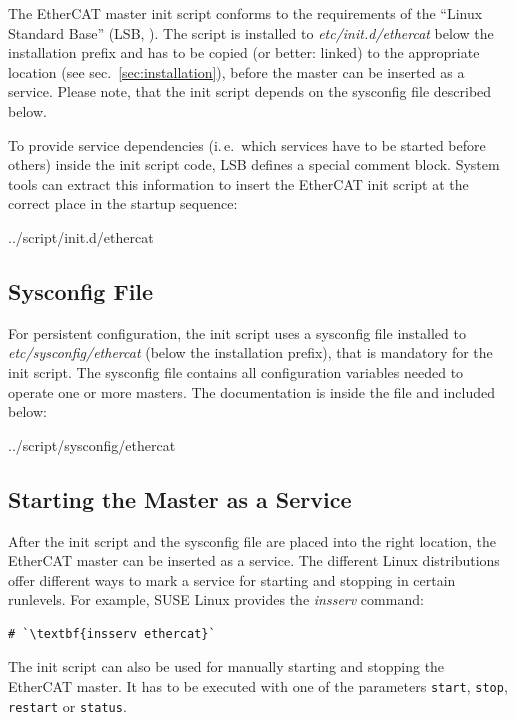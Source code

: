 \documentclass[a4paper,12pt,BCOR6mm,bibtotoc,idxtotoc]{scrbook}
\begin{document}
The EtherCAT master init script conforms to the requirements of the ``Linux
Standard Base'' (LSB, \cite{lsb}). The script is installed to
\textit{etc/init.d/ethercat} below the installation prefix and has to be
copied (or better: linked) to the appropriate location (see
sec.~\ref{sec:installation}), before the master can be inserted as a service.
Please note, that the init script depends on the sysconfig file described
below.

To provide service dependencies (i.\,e.\ which services have to be started
before others) inside the init script code, LSB defines a special comment
block. System tools can extract this information to insert the EtherCAT init
script at the correct place in the startup sequence:


    {../script/init.d/ethercat}

\subsection{Sysconfig File}
\label{sec:sysconfig}

For persistent configuration, the init script uses a sysconfig file installed
to \textit{etc/sysconfig/ethercat} (below the installation prefix), that is
mandatory for the init script. The sysconfig file contains all configuration
variables needed to operate one or more masters. The documentation is inside
the file and included below:


    {../script/sysconfig/ethercat}

\subsection{Starting the Master as a Service}
\label{sec:service}

After the init script and the sysconfig file are placed into the right
location, the EtherCAT master can be inserted as a service. The different Linux
distributions offer different ways to mark a service for starting and stopping
in certain runlevels. For example, SUSE Linux provides the \textit{insserv}
command:

\begin{lstlisting}
# `\textbf{insserv ethercat}`
\end{lstlisting}

The init script can also be used for manually starting and stopping
the EtherCAT master. It has to be executed with one of the parameters
\texttt{start}, \texttt{stop}, \texttt{restart} or \texttt{status}.
\end{document}
